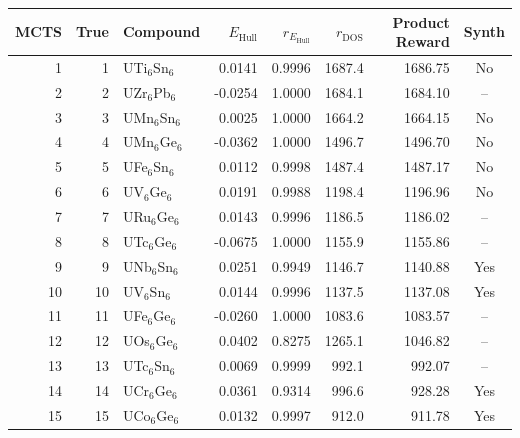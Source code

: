 \begin{tabular}{rrlrrrrc}
\toprule
MCTS & True & Compound & $E_{\mathrm{Hull}}$ & $r_{E_{\mathrm{Hull}}}$ & $r_{\mathrm{DOS}}$ & Product Reward & Synth \\
\midrule
1 & 1 & UTi$_{6}$Sn$_{6}$ & 0.0141 & 0.9996 & 1687.4 & 1686.75 & No \\
2 & 2 & UZr$_{6}$Pb$_{6}$ & -0.0254 & 1.0000 & 1684.1 & 1684.10 & -- \\
3 & 3 & UMn$_{6}$Sn$_{6}$ & 0.0025 & 1.0000 & 1664.2 & 1664.15 & No \\
4 & 4 & UMn$_{6}$Ge$_{6}$ & -0.0362 & 1.0000 & 1496.7 & 1496.70 & No \\
5 & 5 & UFe$_{6}$Sn$_{6}$ & 0.0112 & 0.9998 & 1487.4 & 1487.17 & No \\
6 & 6 & UV$_{6}$Ge$_{6}$ & 0.0191 & 0.9988 & 1198.4 & 1196.96 & No \\
7 & 7 & URu$_{6}$Ge$_{6}$ & 0.0143 & 0.9996 & 1186.5 & 1186.02 & -- \\
8 & 8 & UTc$_{6}$Ge$_{6}$ & -0.0675 & 1.0000 & 1155.9 & 1155.86 & -- \\
9 & 9 & UNb$_{6}$Sn$_{6}$ & 0.0251 & 0.9949 & 1146.7 & 1140.88 & Yes \\
10 & 10 & UV$_{6}$Sn$_{6}$ & 0.0144 & 0.9996 & 1137.5 & 1137.08 & Yes \\
11 & 11 & UFe$_{6}$Ge$_{6}$ & -0.0260 & 1.0000 & 1083.6 & 1083.57 & -- \\
12 & 12 & UOs$_{6}$Ge$_{6}$ & 0.0402 & 0.8275 & 1265.1 & 1046.82 & -- \\
13 & 13 & UTc$_{6}$Sn$_{6}$ & 0.0069 & 0.9999 & 992.1 & 992.07 & -- \\
14 & 14 & UCr$_{6}$Ge$_{6}$ & 0.0361 & 0.9314 & 996.6 & 928.28 & Yes \\
15 & 15 & UCo$_{6}$Ge$_{6}$ & 0.0132 & 0.9997 & 912.0 & 911.78 & Yes \\
\bottomrule
\end{tabular}
